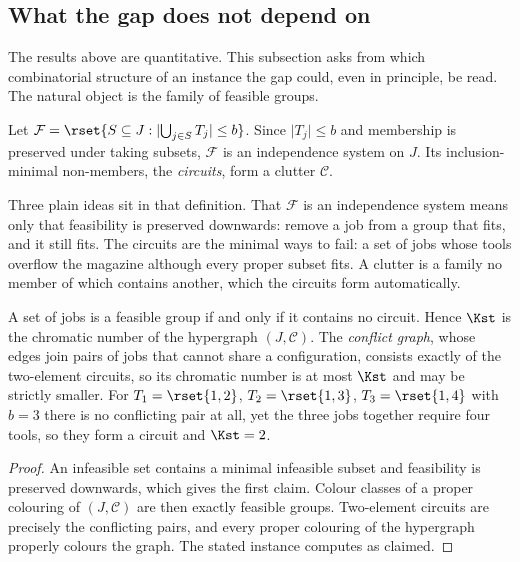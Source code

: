 \subsection{What the gap does not depend on}\label{ssec:clutter}

The results above are quantitative. This subsection asks from which combinatorial
structure of an instance the gap could, even in principle, be read. The natural
object is the family of feasible groups.

\begin{definition}\label{def:complex}
Let $\mathcal{F}=\rset{S\subseteq J:\lvert\bigcup_{j\in S}T_j\rvert\le b}$. Since
$\lvert T_j\rvert\le b$ and membership is preserved under taking subsets,
$\mathcal{F}$ is an independence system on $J$. Its inclusion-minimal non-members,
the \emph{circuits}, form a clutter $\mathcal{C}$.
\end{definition}

Three plain ideas sit in that definition. That $\mathcal{F}$ is an independence system
means only that feasibility is preserved downwards: remove a job from a group that
fits, and it still fits. The circuits are the minimal ways to fail: a set of jobs
whose tools overflow the magazine although every proper subset fits. A clutter is a
family no member of which contains another, which the circuits form automatically.

\begin{proposition}\label{prop:chromK}
A set of jobs is a feasible group if and only if it contains no circuit. Hence $\Kst$
is the chromatic number of the hypergraph $(J,\mathcal{C})$. The \emph{conflict
graph}, whose edges join pairs of jobs that cannot share a configuration, consists
exactly of the two-element circuits, so its chromatic number is at most $\Kst$ and
may be strictly smaller. For $T_1=\rset{1,2}$, $T_2=\rset{1,3}$, $T_3=\rset{1,4}$
with $b=3$ there is no conflicting pair at all, yet the three jobs together require
four tools, so they form a circuit and $\Kst=2$.
\end{proposition}

\begin{proof}
An infeasible set contains a minimal infeasible subset and feasibility is preserved
downwards, which gives the first claim. Colour classes of a proper colouring of
$(J,\mathcal{C})$ are then exactly feasible groups. Two-element circuits are precisely
the conflicting pairs, and every proper colouring of the hypergraph properly colours
the graph. The stated instance computes as claimed.
\end{proof}

